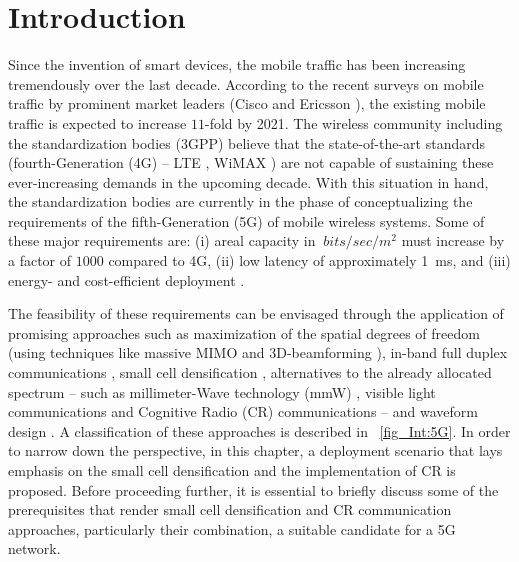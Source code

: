 \section{Introduction}
\label{sec:Int}
Since the invention of smart devices, the mobile traffic has been increasing tremendously over the last decade. According to the recent surveys on mobile traffic by prominent market leaders (Cisco \cite{CISCO14} and Ericsson \cite{Eric15}), the existing mobile traffic is expected to increase $11$-fold  by 2021. The wireless community including the standardization bodies (3GPP) believe that the state-of-the-art standards (fourth-Generation (4G)  -- LTE , WiMAX ) are not capable of sustaining these ever-increasing demands in the upcoming decade. With this situation in hand, the standardization bodies are currently in the phase of conceptualizing the requirements of the fifth-Generation (5G)  of mobile wireless systems.
Some of these major requirements are: (i) areal capacity in $\SI{}{bits/sec/m^2}$ must increase by a factor of $1000$ compared to 4G, (ii) low latency of approximately \SI{1}{ms}, and (iii) energy- and cost-efficient deployment \cite{Andrews14}.

The feasibility of these requirements can be envisaged through the application of promising approaches such as maximization of the spatial degrees of freedom (using techniques like massive MIMO \cite{Lar14} and 3D-beamforming \cite{Hal13}), in-band full duplex communications  \cite{Sab14}, small cell densification \cite{Andrews12, Gel13}, alternatives to the already allocated spectrum -- such as millimeter-Wave technology (mmW) \cite{Rapp13}, visible light communications \cite{Wu14} and Cognitive Radio (CR) communications -- and waveform design \cite{Scha14}. A classification of these approaches is described in \figurename~\ref{fig_Int:5G}. In order to narrow down the perspective, in this chapter, a deployment scenario that lays emphasis on the small cell densification and the implementation of CR is proposed. Before proceeding further, it is essential to briefly discuss some of the prerequisites that render small cell densification and CR communication approaches, particularly their combination, a suitable candidate for a 5G network.


